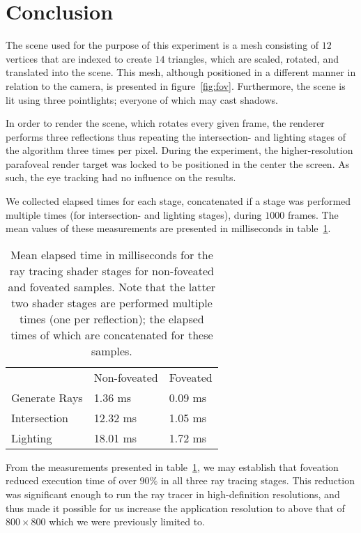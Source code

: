 
\section{Conclusion}
The scene used for the purpose of this experiment is a mesh consisting of $12$ vertices that are indexed to create $14$ triangles, which are scaled, rotated, and translated into the scene.
This mesh, although positioned in a different manner in relation to the camera, is presented in figure~\ref{fig:fov}.
Furthermore, the scene is lit using three pointlights; everyone of which may cast shadows.

In order to render the scene, which rotates every given frame, the renderer performs three reflections thus repeating the intersection- and lighting stages of the algorithm three times per pixel.
During the experiment, the higher-resolution parafoveal render target was locked to be positioned in the center the screen.
As such, the eye tracking had no influence on the results.

We collected elapsed times for each stage, concatenated if a stage was performed multiple times (for intersection- and lighting stages), during $1000$ frames.
The mean values of these measurements are presented in milliseconds in table~\ref{tab:res}.

\begin{table}[h]
\begin{tabular}{lll}
  & Non-foveated & Foveated \\
  Generate Rays & 1.36\phantom{0} ms & 0.09 ms \\
  Intersection & 12.32 ms & 1.05 ms \\
  Lighting & 18.01 ms & 1.72 ms
\end{tabular}
\caption{Mean elapsed time in milliseconds for the ray tracing shader stages for non-foveated and foveated samples. Note that the latter two shader stages are performed multiple times (one per reflection); the elapsed times of which are concatenated for these samples.}
\label{tab:res}
\end{table}

From the measurements presented in table~\ref{tab:res}, we may establish that foveation reduced execution time of over $90\%$ in all three ray tracing stages.
This reduction was significant enough to run the ray tracer in high-definition resolutions, and thus made it possible for us increase the application resolution to above that of $800\times 800$ which we were previously limited to.

